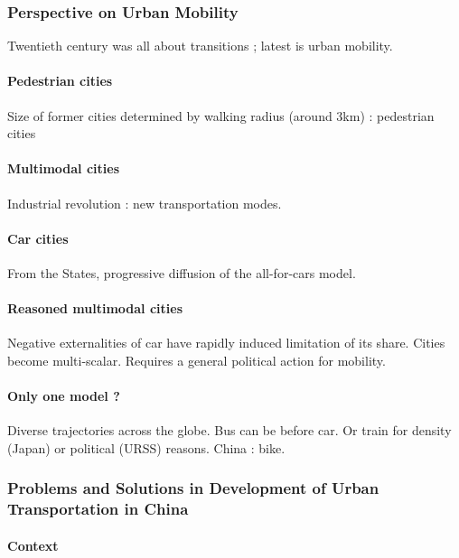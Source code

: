 \subsubsection{Perspective on Urban Mobility}

Twentieth century was all about transitions ; latest is urban mobility.

\paragraph{Pedestrian cities}

Size of former cities determined by walking radius (around 3km) : pedestrian cities

\paragraph{Multimodal cities}

Industrial revolution : new transportation modes.

\paragraph{Car cities}

From the States, progressive diffusion of the all-for-cars model.

\paragraph{Reasoned multimodal cities}

Negative externalities of car have rapidly induced limitation of its share. Cities become multi-scalar. Requires a general political action for mobility.

\paragraph{Only one model ?}

Diverse trajectories across the globe. Bus can be before car. Or train for density (Japan) or political (URSS) reasons. China : bike.


\subsubsection{Problems and Solutions in Development of Urban Transportation in China}

\paragraph{Context}

